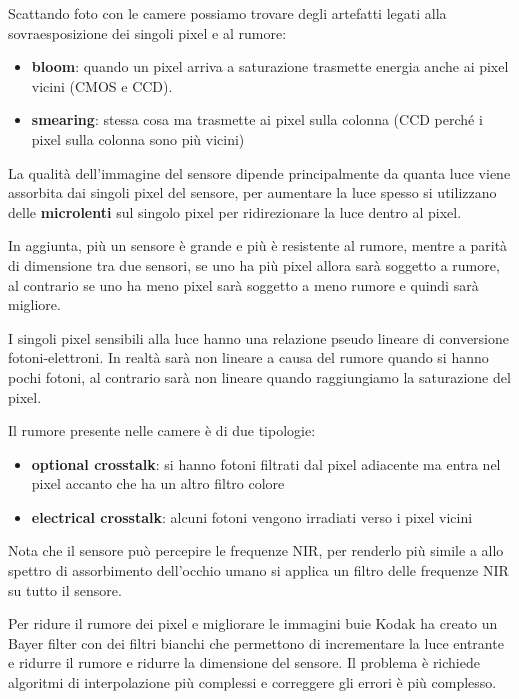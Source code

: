 Scattando foto con le camere possiamo trovare degli artefatti legati alla sovraesposizione 
dei singoli pixel e al rumore:
\begin{itemize}
    \item \textbf{bloom}: quando un pixel arriva a saturazione trasmette energia 
    anche ai pixel vicini (CMOS e CCD).
    \item \textbf{smearing}: stessa cosa ma trasmette ai pixel sulla colonna (CCD 
    perché i pixel sulla colonna sono più vicini)
\end{itemize}

La qualità dell'immagine del sensore dipende principalmente da quanta luce viene 
assorbita dai singoli pixel del sensore, per aumentare la luce spesso si utilizzano 
delle \textbf{microlenti} sul singolo pixel per ridirezionare la luce dentro al pixel.

In aggiunta, più un sensore è grande e più è resistente al rumore, mentre a parità 
di dimensione tra due sensori, se uno ha più pixel allora sarà soggetto a rumore, 
al contrario se uno ha meno pixel sarà soggetto a meno rumore e quindi sarà migliore.

I singoli pixel sensibili alla luce hanno una relazione pseudo lineare di conversione 
fotoni-elettroni. In realtà sarà non lineare a causa del rumore quando si hanno 
pochi fotoni, al contrario sarà non lineare quando raggiungiamo la saturazione del
pixel.

Il rumore presente nelle camere è di due tipologie:
\begin{itemize}
    \item \textbf{optional crosstalk}: si hanno fotoni filtrati dal pixel adiacente ma 
    entra nel pixel accanto che ha un altro filtro colore
    \item \textbf{electrical crosstalk}: alcuni fotoni vengono irradiati verso i pixel 
    vicini
\end{itemize}

Nota che il sensore può percepire le frequenze NIR, per renderlo più simile a allo 
spettro di assorbimento dell'occhio umano si applica un filtro delle frequenze NIR 
su tutto il sensore.

Per ridure il rumore  dei pixel e migliorare le immagini buie Kodak ha creato un Bayer filter con dei filtri bianchi
che permettono di incrementare la luce entrante e ridurre il rumore e ridurre la 
dimensione del sensore. Il problema è
richiede algoritmi di interpolazione più complessi e correggere gli errori è più
complesso.

